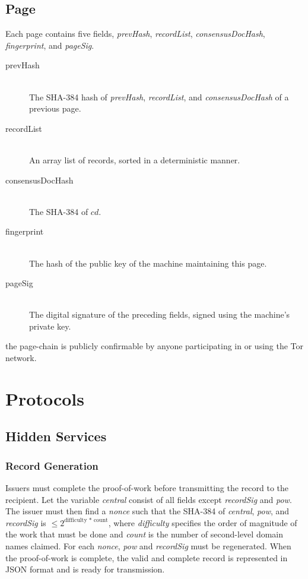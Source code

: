 \subsection{Page}

Each page contains five fields, \emph{prevHash}, \emph{recordList}, \emph{consensusDocHash}, \emph{fingerprint}, and \emph{pageSig}.

\begin{description}
	\item[prevHash] \hfill \\
		The SHA-384 hash of \emph{prevHash}, \emph{recordList}, and \emph{consensusDocHash} of a previous page.
	\item[recordList] \hfill \\
		An array list of records, sorted in a deterministic manner.
	\item[consensusDocHash] \hfill \\
		The SHA-384 of $ cd $.
	\item[fingerprint] \hfill \\
		The hash of the public key of the machine maintaining this page.
	\item[pageSig] \hfill \\
		The digital signature of the preceding fields, signed using the machine's private key.
\end{description}

the page-chain is publicly confirmable by anyone participating in or using the Tor network.

\section{Protocols}
\label{sec:Protocols}

\subsection{Hidden Services}
\label{sec:ProtoHiddenServices}

\subsubsection{Record Generation}

Issuers must complete the proof-of-work before transmitting the record to the recipient. Let the variable \emph{central} consist of all fields except \emph{recordSig} and \emph{pow}. The issuer must then find a \emph{nonce} such that the SHA-384 of \emph{central}, \emph{pow}, and \emph{recordSig} is $ \leq 2^\textrm{difficulty * count} $, where \emph{difficulty} specifies the order of magnitude of the work that must be done and \emph{count} is the number of second-level domain names claimed. For each \emph{nonce}, \emph{pow} and \emph{recordSig} must be regenerated. When the proof-of-work is complete, the valid and complete record is represented in JSON format and is ready for transmission.

